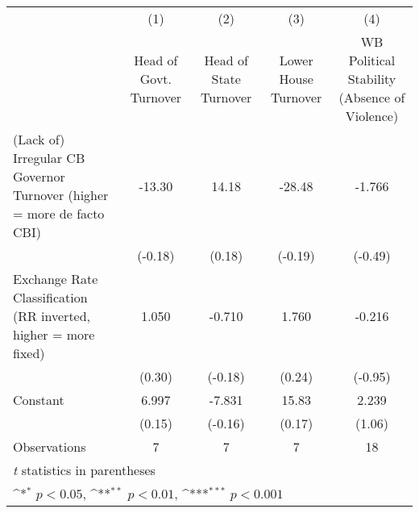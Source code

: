 {
\def\sym#1{\ifmmode^{#1}\else\(^{#1}\)\fi}
\begin{tabular*}{\linewidth}{@{\hskip\tabcolsep\extracolsep\fill}l*{4}{c}}
\toprule
                &\multicolumn{1}{c}{(1)}&\multicolumn{1}{c}{(2)}&\multicolumn{1}{c}{(3)}&\multicolumn{1}{c}{(4)}\\
                &\multicolumn{1}{c}{Head of Govt. Turnover}&\multicolumn{1}{c}{Head of State Turnover}&\multicolumn{1}{c}{Lower House Turnover}&\multicolumn{1}{c}{WB Political Stability (Absence of Violence)}\\
\midrule
(Lack of) Irregular CB Governor Turnover (higher = more de facto CBI)&   -13.30         &    14.18         &   -28.48         &   -1.766         \\
                &  (-0.18)         &   (0.18)         &  (-0.19)         &  (-0.49)         \\
\addlinespace
Exchange Rate Classification (RR inverted, higher = more fixed)&    1.050         &   -0.710         &    1.760         &   -0.216         \\
                &   (0.30)         &  (-0.18)         &   (0.24)         &  (-0.95)         \\
\addlinespace
Constant        &    6.997         &   -7.831         &    15.83         &    2.239         \\
                &   (0.15)         &  (-0.16)         &   (0.17)         &   (1.06)         \\
\midrule
Observations    &        7         &        7         &        7         &       18         \\
\bottomrule
\multicolumn{5}{l}{\footnotesize \textit{t} statistics in parentheses}\\
\multicolumn{5}{l}{\footnotesize \sym{*} \(p<0.05\), \sym{**} \(p<0.01\), \sym{***} \(p<0.001\)}\\
\end{tabular*}
}

